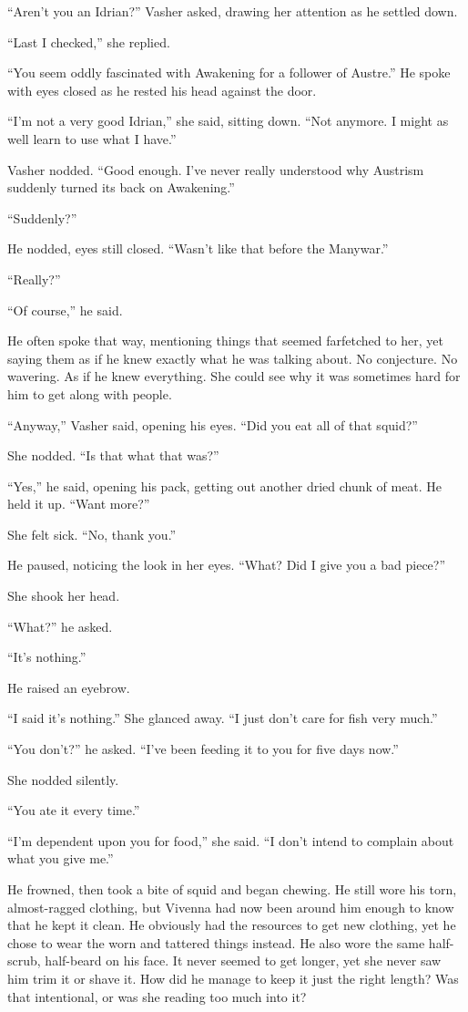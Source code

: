 “Aren’t you an Idrian?” Vasher asked, drawing her attention as he settled down.

“Last I checked,” she replied.

“You seem oddly fascinated with Awakening for a follower of Austre.” He spoke with eyes closed as he rested his head against the door.

“I’m not a very good Idrian,” she said, sitting down. “Not anymore. I might as well learn to use what I have.”

Vasher nodded. “Good enough. I’ve never really understood why Austrism suddenly turned its back on Awakening.”

“Suddenly?”

He nodded, eyes still closed. “Wasn’t like that before the Manywar.”

“Really?”

“Of course,” he said.

He often spoke that way, mentioning things that seemed farfetched to her, yet saying them as if he knew exactly what he was talking about. No conjecture. No wavering. As if he knew everything. She could see why it was sometimes hard for him to get along with people.

“Anyway,” Vasher said, opening his eyes. “Did you eat all of that squid?”

She nodded. “Is that what that was?”

“Yes,” he said, opening his pack, getting out another dried chunk of meat. He held it up. “Want more?”

She felt sick. “No, thank you.”

He paused, noticing the look in her eyes. “What? Did I give you a bad piece?”

She shook her head.

“What?” he asked.

“It’s nothing.”

He raised an eyebrow.

“I said it’s nothing.” She glanced away. “I just don’t care for fish very much.”

“You don’t?” he asked. “I’ve been feeding it to you for five days now.”

She nodded silently.

“You ate it every time.”

“I’m dependent upon you for food,” she said. “I don’t intend to complain about what you give me.”

He frowned, then took a bite of squid and began chewing. He still wore his torn, almost-ragged clothing, but Vivenna had now been around him enough to know that he kept it clean. He obviously had the resources to get new clothing, yet he chose to wear the worn and tattered things instead. He also wore the same half-scrub, half-beard on his face. It never seemed to get longer, yet she never saw him trim it or shave it. How did he manage to keep it just the right length? Was that intentional, or was she reading too much into it?

